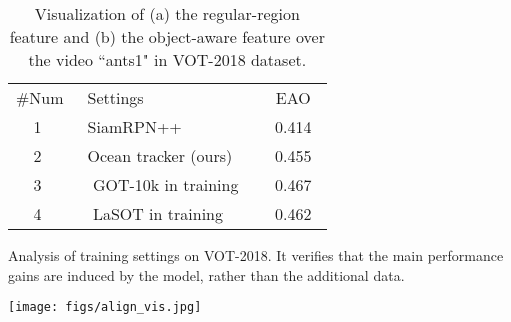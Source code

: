 \documentclass[runningheads]{llncs}
\begin{document}
\begin{table}[!t]\selectfont
\begin{minipage}[t]{.48\textwidth}
		
		\vspace{-6.2em}
		\setlength{\abovecaptionskip}{0pt}\centering


\fontsize{9.5pt}{4mm}
		\begin{threeparttable}


			\begin{tabular}{  @{}c@{}| @{}l@{} |@{}c@{}}
				
				\#Num & ~Settings & ~EAO~
				\\  \cline{1-3}
				\textcircled{1} & ~SiamRPN++~\cite{SiamRPN++}   & 0.414
				
				\\
				\textcircled{2} & ~Ocean tracker (ours)   & 0.455
				
				\\
				\textcircled{3} & ~ GOT-10k in training ~ & 0.467
				
				\\
				\textcircled{4} & ~ LaSOT in training ~  & 0.462
				




				
				
			\end{tabular}
		\end{threeparttable}
		\vspace{0.6em}
		\caption{Analysis of training settings on VOT-2018. It verifies that the main performance gains are induced by the model, rather than the additional data.}
\label{SETTAB}
		
		
	\end{minipage}\hfill
\begin{minipage}[t]{.48\textwidth}

		
\setlength{\abovecaptionskip}{0pt}\centering
\texttt{[image: figs/align\_vis.jpg]} 
\makeatletter\def\@captype{figure}\makeatother
\caption{Visualization of (a) the regular-region feature and (b) the object-aware feature over the video ``ants1" in VOT-2018 \cite{VOT-2018} dataset. }
		\label{VISUALFIG}


	\end{minipage}
	\vspace{-3.2em}
	
\end{table}
\end{document}
